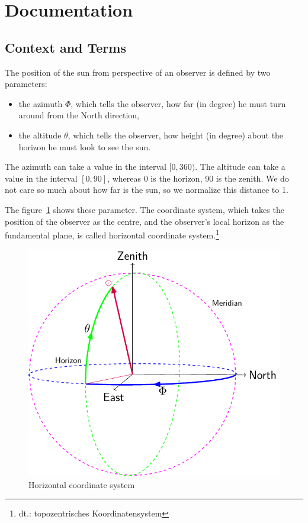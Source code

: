 \section{Documentation}

\subsection{Context and Terms}
The position of the sun from perspective of an observer is defined by two parameters:

\begin{itemize}
  \item the azimuth $\Phi$, which tells the observer, how far (in degree) he must turn around from the North direction,
  \item the altitude $\theta$, which tells the observer, how height (in degree) about the horizon he must look to see the sun.
\end{itemize}
The azimuth can take a value in the interval $[0,360)$. 
The altitude can take a value in the interval $[0,90]$, whereas 0 is the horizon, 90 is the zenith.
We do not care so much about how far is the sun, so we normalize this distance to 1.


The figure~\ref{fig:hz-coordinate} shows these parameter. 
The coordinate system, which takes the position of the observer as the centre, 
and the observer's local horizon as the  fundamental plane,
is called horizontal coordinate system.\footnote{dt.: topozentrisches Koordinatensystem}

\begin{figure}[H]
\centering
\includegraphics[scale=0.75]{horizontal-coordinate.pdf}
\caption{Horizontal coordinate system}
\label{fig:hz-coordinate}
\end{figure}

